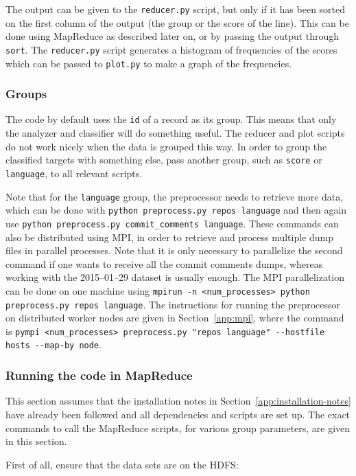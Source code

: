 \documentclass{article}
\begin{document}
The output can be given to the \texttt{reducer.py} script, but only if it has 
been sorted on the first column of the output (the group or the score of the 
line). This can be done using MapReduce as described later on, or by passing 
the output through \texttt{sort}. The \texttt{reducer.py} script generates 
a histogram of frequencies of the scores which can be passed to 
\texttt{plot.py} to make a graph of the frequencies.

\subsubsection{Groups}\label{app:groups}
The code by default uses the \texttt{id} of a record as its group. This means 
that only the analyzer and classifier will do something useful. The reducer and 
plot scripts do not work nicely when the data is grouped this way. In order to 
group the classified targets with something else, pass another group, such as 
\texttt{score} or \texttt{language}, to all relevant scripts.

Note that for the \texttt{language} group, the preprocessor needs to retrieve 
more data, which can be done with \texttt{python preprocess.py repos language} 
and then again use \texttt{python preprocess.py commit\_comments language}. 
These commands can also be distributed using MPI, in order to retrieve and 
process multiple dump files in parallel processes. Note that it is only 
necessary to parallelize the second command if one wants to receive all the 
commit comments dumps, whereas working with the 2015--01--29 dataset is 
usually enough. The MPI parallelization can be done on one machine using 
\texttt{mpirun -n <num\_processes> python preprocess.py 
repos language}. The instructions for running the preprocessor on distributed 
worker nodes are given in Section~\ref{app:mpi}, where the command is 
\texttt{pympi <num\_processes> preprocess.py "repos 
language" -{}-hostfile hosts -{}-map-by node}.

\subsubsection{Running the code in MapReduce}\label{app:mapreduce}
This section assumes that the installation notes in 
Section~\ref{app:installation-notes} have already been followed and all 
dependencies and scripts are set up. The exact commands to call the MapReduce 
scripts, for various group parameters, are given in this section.

First of all, ensure that the data sets are on the HDFS:
\end{document}
